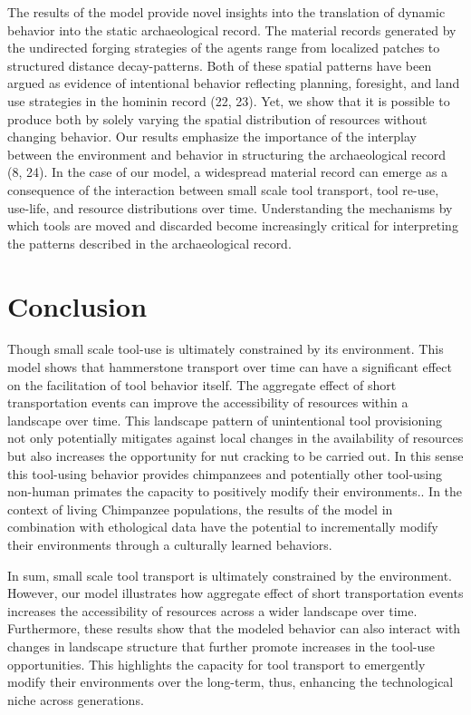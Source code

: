 \documentclass[9pt,twocolumn,twoside,]{pnas-new}
\begin{document}
The results of the model provide novel insights into the translation of
dynamic behavior into the static archaeological record. The material
records generated by the undirected forging strategies of the agents
range from localized patches to structured distance decay-patterns. Both
of these spatial patterns have been argued as evidence of intentional
behavior reflecting planning, foresight, and land use strategies in the
hominin record (22, 23). Yet, we show that it is possible to produce
both by solely varying the spatial distribution of resources without
changing behavior. Our results emphasize the importance of the interplay
between the environment and behavior in structuring the archaeological
record (8, 24). In the case of our model, a widespread material record
can emerge as a consequence of the interaction between small scale tool
transport, tool re-use, use-life, and resource distributions over time.
Understanding the mechanisms by which tools are moved and discarded
become increasingly critical for interpreting the patterns described in
the archaeological record.

\hypertarget{conclusion}{%
\section{Conclusion}\label{conclusion}}

Though small scale tool-use is ultimately constrained by its
environment. This model shows that hammerstone transport over time can
have a significant effect on the facilitation of tool behavior itself.
The aggregate effect of short transportation events can improve the
accessibility of resources within a landscape over time. This landscape
pattern of unintentional tool provisioning not only potentially
mitigates against local changes in the availability of resources but
also increases the opportunity for nut cracking to be carried out. In
this sense this tool-using behavior provides chimpanzees and potentially
other tool-using non-human primates the capacity to positively modify
their environments.. In the context of living Chimpanzee populations,
the results of the model in combination with ethological data have the
potential to incrementally modify their environments through a
culturally learned behaviors.

In sum, small scale tool transport is ultimately constrained by the
environment. However, our model illustrates how aggregate effect of
short transportation events increases the accessibility of resources
across a wider landscape over time. Furthermore, these results show that
the modeled behavior can also interact with changes in landscape
structure that further promote increases in the tool-use opportunities.
This highlights the capacity for tool transport to emergently modify
their environments over the long-term, thus, enhancing the technological
niche across generations.
\end{document}
